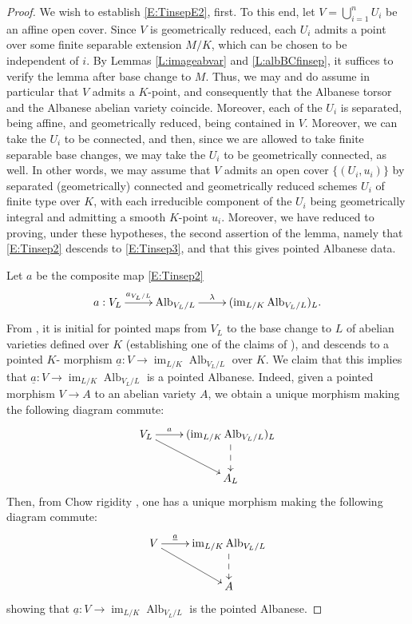 \documentclass[11pt, reqno]{amsart}
\numberwithin{equation}{section}
\theoremstyle{definition}
\theoremstyle{remark}
\DeclareMathOperator{\im}{im}
\newcommand{\ubar}[1]{{\underline{#1}}}
\DeclareMathOperator{\alb}{Alb}
\begin{document}
 \begin{proof}  
 We wish to establish   \eqref{E:TinsepE2}, first.  To this end, let $V = \bigcup_{i=1}^n U_i$ be an affine open cover.
  Since $V$ is geometrically reduced, each $U_i$ admits a point over some finite
  separable extension $M/K$, which can be chosen to be independent of $i$.  By Lemmas \ref{L:imageabvar} and
  \ref{L:albBCfinsep}, it suffices to verify the lemma after base change
  to $M$.  Thus, we may and do assume in particular that $V$ admits a $K$-point, and
  consequently  that the Albanese torsor and the Albanese abelian variety
  coincide.  Moreover, each of the $U_i$ is separated, being affine, and geometrically reduced, being contained in $V$.  Moreover, we can take the $U_i$ to be connected, and then, since we are allowed to take finite separable base changes, we may take the $U_i$ to be geometrically connected, as well.  In other words, 
  we may assume that  $V$ admits an open cover $\{(U_i,u_i)\}$ by separated  (geometrically) connected
  and geometrically reduced schemes $U_i$ of finite type over $K$, with each irreducible component of the $U_i$ being geometrically integral and admitting a smooth $K$-point $u_i$.  Moreover, 
  we have reduced to proving, under these hypotheses, the second assertion of the lemma, namely that  \eqref{E:Tinsep2} descends to  \eqref{E:Tinsep3}, and that this gives pointed Albanese data.  

Let
  $a$ be the composite map \eqref{E:Tinsep2}
  \[
  \xymatrix{
   a: V_L \ar[r]^<>(0.5){a_{V_L/L}} & \alb_{V_L/L} \ar[r]^<>(0.5)\lambda & (\im_{L/K}\alb_{V_L/L})_L.
  }
  \]
  From , 
  it is initial for pointed maps from $V_L$ to the base change to $L$ of abelian varieties
  defined over $K$ (establishing one of the claims of ), 
  and  descends to a pointed $K$-
  morphism $\ubar a :V \to \im_{L/K}\alb_{V_L/L}$ over $K$. 
  We claim that this implies that $\ubar a:V\to   \im_{L/K}\alb_{V_L/L}$ is a pointed Albanese.  
   Indeed, given a pointed morphism $V\to A$ to an abelian variety $A$, we obtain a unique morphism making the following diagram commute:
$$
\xymatrix{
V_L\ar[r]^<>(0.5){a} \ar[rd]& (\im_{L/K}\alb_{V_L/L})_L \ar@{-->}[d]\\
& A_L}
$$
Then, from Chow rigidity \cite[Thm.~3.19]{conradtrace}, one has a unique morphism making the following diagram commute:
$$
\xymatrix{
V\ar[r]^<>(0.5){\ubar a } \ar[rd]& \im_{L/K}\alb_{V_L/L}\ar@{-->}[d]\\
& A}
$$  
showing that $\ubar a: V\to \im_{L/K}\alb_{V_L/L}$ is the pointed Albanese.  
 \end{proof}
\end{document}
